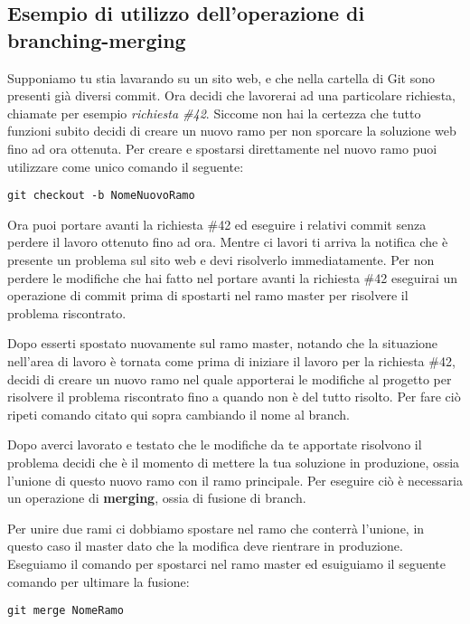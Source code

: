 \subsection{Esempio di utilizzo dell'operazione di branching-merging}
Supponiamo tu stia lavarando su un sito web, e che nella cartella di Git sono presenti già diversi commit. Ora decidi che lavorerai ad una particolare richiesta, chiamate per esempio \textit{richiesta \#42}. Siccome non hai la certezza che tutto funzioni subito decidi di creare un nuovo ramo per non sporcare la soluzione web fino ad ora ottenuta. Per creare e spostarsi direttamente nel nuovo ramo puoi utilizzare come unico comando il seguente:

\begin{center}
\texttt{git checkout -b NomeNuovoRamo}
\end{center}

Ora puoi portare avanti la richiesta \#42 ed eseguire i relativi commit senza perdere il lavoro ottenuto fino ad ora. Mentre ci lavori ti arriva la notifica che è presente un problema sul sito web e devi risolverlo immediatamente. Per non perdere le modifiche che hai fatto nel portare avanti la richiesta \#42 eseguirai un operazione di commit prima di spostarti nel ramo master per risolvere il problema riscontrato.

Dopo esserti spostato nuovamente sul ramo master, notando che la situazione nell'area di lavoro è tornata come prima di iniziare il lavoro per la richiesta \#42, decidi di creare un nuovo ramo nel quale apporterai le modifiche al progetto per risolvere il problema riscontrato fino a quando non è del tutto risolto. Per fare ciò ripeti comando citato qui sopra cambiando il nome al branch.

Dopo averci lavorato e testato che le modifiche da te apportate risolvono il problema decidi che è il momento di mettere la tua soluzione in produzione, ossia l'unione di questo nuovo ramo con il ramo principale. Per eseguire ciò è necessaria un operazione di \textbf{merging}, ossia di fusione di branch.

Per unire due rami ci dobbiamo spostare nel ramo che conterrà l'unione, in questo caso il master dato che la modifica deve rientrare in produzione. Eseguiamo il comando per spostarci nel ramo master ed esuiguiamo il seguente comando per ultimare la fusione:

\begin{center}
\texttt{git merge NomeRamo}
\end{center}

